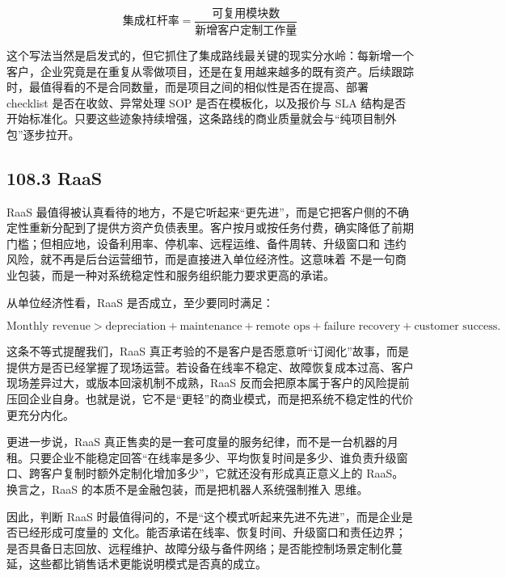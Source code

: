 \begin{equation*}
\text{集成杠杆率} = \frac{\text{可复用模块数}}{\text{新增客户定制工作量}}
\end{equation*}

这个写法当然是启发式的，但它抓住了集成路线最关键的现实分水岭：每新增一个客户，企业究竟是在重复从零做项目，还是在复用越来越多的既有资产。后续跟踪时，最值得看的不是合同数量，而是项目之间的相似性是否在提高、部署 checklist 是否在收敛、异常处理 SOP 是否在模板化，以及报价与 SLA 结构是否开始标准化。只要这些迹象持续增强，这条路线的商业质量就会与“纯项目制外包”逐步拉开。

\subsection*{108.3 RaaS}


RaaS 最值得被认真看待的地方，不是它听起来“更先进”，而是它把客户侧的不确定性重新分配到了提供方资产负债表里。客户按月或按任务付费，确实降低了前期 \texttt{} 门槛；但相应地，设备利用率、停机率、远程运维、备件周转、升级窗口和 \texttt{} 违约风险，就不再是后台运营细节，而是直接进入单位经济性。这意味着 \texttt{} 不是一句商业包装，而是一种对系统稳定性和服务组织能力要求更高的承诺。

从单位经济性看，RaaS 是否成立，至少要同时满足：

\begingroup
\scriptsize
\begin{equation*}
\text{Monthly revenue} >
\text{depreciation} + \text{maintenance} + \text{remote ops} + \text{failure recovery} + \text{customer success}.
\end{equation*}
\endgroup

这条不等式提醒我们，RaaS 真正考验的不是客户是否愿意听“订阅化”故事，而是提供方是否已经掌握了现场运营。若设备在线率不稳定、故障恢复成本过高、客户现场差异过大，或版本回滚机制不成熟，RaaS 反而会把原本属于客户的风险提前压回企业自身。也就是说，它不是“更轻”的商业模式，而是把系统不稳定性的代价更充分内化。

更进一步说，RaaS 真正售卖的是一套可度量的服务纪律，而不是一台机器的月租。只要企业不能稳定回答“在线率是多少、平均恢复时间是多少、谁负责升级窗口、跨客户复制时额外定制化增加多少”，它就还没有形成真正意义上的 RaaS。换言之，RaaS 的本质不是金融包装，而是把机器人系统强制推入 \texttt{} 思维。

因此，判断 RaaS 时最值得问的，不是“这个模式听起来先进不先进”，而是企业是否已经形成可度量的 \texttt{} 文化。能否承诺在线率、恢复时间、升级窗口和责任边界；是否具备日志回放、远程维护、故障分级与备件网络；是否能控制场景定制化蔓延，这些都比销售话术更能说明模式是否真的成立。

